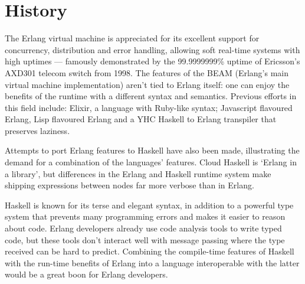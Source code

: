 \section{History}

The Erlang virtual machine is appreciated for its excellent support for
concurrency, distribution and error handling, allowing soft real-time systems
with high uptimes --- famously demonstrated by the 99.9999999\% uptime of
Ericsson’s AXD301 telecom switch from 1998\cite{ninenines}. The features of the BEAM (Erlang’s
main virtual machine implementation) aren't tied to Erlang itself: one can
enjoy the benefits of the runtime with a different syntax and semantics.
Previous efforts in this field include: Elixir, a language with Ruby-like
syntax; Javascript flavoured Erlang, Lisp flavoured Erlang and a YHC Haskell
to Erlang transpiler that preserves laziness.

Attempts to port Erlang features to Haskell have also been made, illustrating
the demand for a combination of the languages’ features. Cloud Haskell is
‘Erlang in a library’, but differences in the Erlang and Haskell runtime
system make shipping expressions between nodes far more verbose than in Erlang.

Haskell is known for its terse and elegant syntax, in addition to a powerful
type system that prevents many programming errors and makes it easier to
reason about code. Erlang developers already use code analysis tools to write
typed code, but these tools don’t interact well with message passing where the type received can be hard to predict. Combining the compile-time features of Haskell with the run-time benefits of Erlang into a language interoperable with the latter would be a great boon for Erlang developers.

